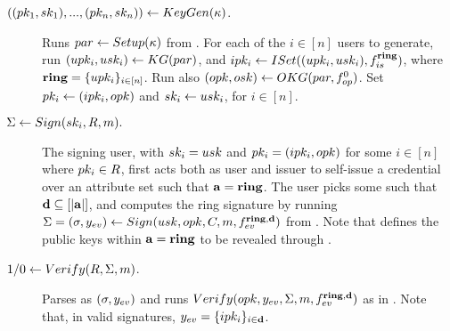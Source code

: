 

\begin{description}
\item[$((pk_1,sk_1),...,(pk_n,sk_n)) \gets KeyGen(\kappa)$.] Runs
  $par \gets Setup(\kappa)$ from \CUASGenHideIss. For each of
  the $i \in [n]$ users to generate, run $(upk_i,usk_i) \gets KG(par)$,
  and $ipk_i \gets ISet((upk_i,usk_i),f_{is}^{\mathbf{ring}})$, where $\mathbf{ring} =
  \lbrace upk_i \rbrace_{i\in[n]}$. Run also $(opk,osk) \gets OKG(par,
  f_{op}^0)$. Set $pk_i \gets (ipk_i,opk)$ and $sk_i \gets usk_i$, for
  $i\in[n]$.
\item[$\Sigma \gets Sign(sk_i,R,m).$]
  The signing user, with $sk_i=usk$ and $pk_i=(ipk_i,opk)$ for some $i \in
  [n]$ where $pk_i \in R$, first acts both as user and issuer to self-issue a
  credential \Cred over an attribute set \attrs such that $\mathbf{a} = \mathbf{ring}$. The
  user picks some \dattrs such that $\mathbf{d} \subseteq [|\mathbf{a}|]$, and computes
  the ring signature by running $\Sigma = (\sigma,y_{ev}) \gets
  Sign(usk,opk,C,m,f_{ev}^{\mathbf{ring},\mathbf{d}})$ from
  \CUASGenHideIss. Note that \dattrs defines the public keys within
  $\mathbf{a} = \mathbf{ring}$ to be revealed through \yeval.
\item[$1/0 \gets Verify(R,\Sigma,m)$.] Parses \Sig as $(\sigma,y_{ev})$ and
  runs $Verify(opk,y_{ev},\Sigma,m,f_{ev}^{\mathbf{ring},\mathbf{d}})$ as in
  \CUASGenHideIss. Note that, in valid signatures, $y_{ev} = \lbrace
  ipk_i\rbrace_{i\in\mathbf{d}}$.
\end{description}

